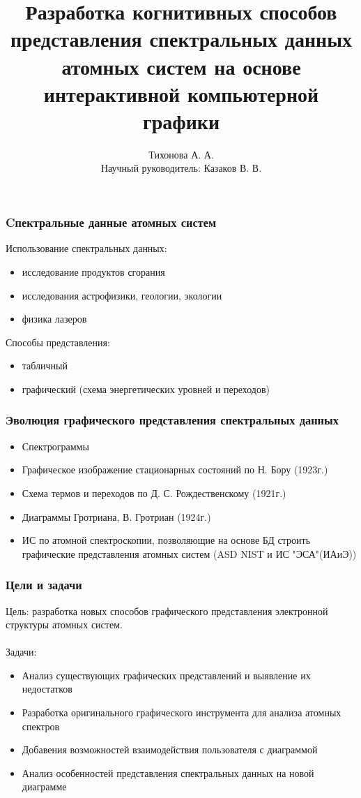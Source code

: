 \documentclass{beamer}
\title{Разработка когнитивных способов представления спектральных данных атомных систем на основе интерактивной компьютерной графики}
\author{Тихонова А. А. \\
        Научный руководитель: Казаков В. В.}
\institute{Новосибирский Государственный Университет}
\begin{document}
\begin{frame}
\titlepage
\end{frame}

\begin{frame}
\frametitle{Cпектральные данные атомных систем}
    Использование спектральных данных:
    \begin{itemize}
        \item исследование продуктов сгорания
        \item исследования астрофизики, геологии, экологии
        \item физика лазеров
    \end{itemize}
    Способы представления:
    \begin{itemize}
        \item табличный
        \item графический (схема энергетических уровней и переходов)
    \end{itemize}
\end{frame}

\begin{frame}
\frametitle{Эволюция графического представления спектральных данных}
    \begin{itemize}
        \item Спектрограммы
        \item Графическое изображение стационарных состояний по Н. Бору (1923г.)
        \item Схема термов и переходов по Д. С. Рождественскому (1921г.)
        \item Диаграммы Гротриана, В. Гротриан (1924г.)
        \item ИС по атомной спектроскопии, позволяющие на основе БД строить графические представления атомных систем (ASD NIST и ИС "ЭСА"(ИАиЭ))
    \end{itemize}
\end{frame}

\begin{frame}
\frametitle{Цели и задачи}
    Цель: разработка новых способов графического представления электронной структуры атомных систем.
     \\~\\
    Задачи:
    \begin{itemize}
        \item Анализ существующих графических представлений и выявление их недостатков
        \item Разработка оригинального графического инструмента для анализа атомных спектров
        \item Добавения возможностей взаимодействия пользователя с диаграммой
        \item Анализ особенностей представления спектральных данных на новой диаграмме
    \end{itemize}
\end{frame}
\end{document}
